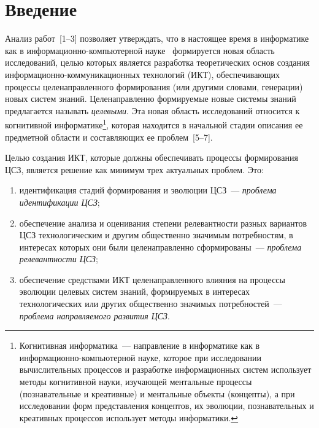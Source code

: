       \begin{multicols}{2}

      \label{st\stat}
      
\section{Введение}

   Анализ работ~[1--3] позволяет утверждать, что в настоящее время в информатике 
как в ин\-фор\-ма\-ци\-он\-но-компью\-тер\-ной науке~\cite{4zat} формируется новая область 
исследований, целью которых является разработка теоретических основ\linebreak
 создания 
информационно-коммуникационных тех\-но\-ло\-гий (ИКТ), обеспечивающих процессы 
целенаправленного формирования (или другими словами, генерации) новых систем знаний. 
Целенаправленно формируемые новые системы знаний предлагается называть 
\textit{целевыми}. Эта новая область исследований относится к когнитивной 
информатике\footnote[2]{Когнитивная информатика~--- направление в информатике как в информационно-компьютерной науке, 
которое при исследовании вычислительных процессов и разработке информационных 
систем использует методы когнитивной науки, изучающей ментальные процессы (познавательные и 
креативные) и ментальные объекты (концепты), а при исследовании форм представления концептов, их 
эволюции, познавательных и креативных процессов использует методы информатики.}, которая 
находится в начальной стадии описания ее предметной области и составляющих ее 
проблем~[5--7].
   
   Целью создания ИКТ, которые должны обеспечивать процессы формирования  
ЦСЗ, является решение как минимум трех актуальных проблем. Это:
   \begin{enumerate}[(1)]
\item идентификация стадий формирования и эволюции ЦСЗ~--- \textit{проблема 
идентификации ЦСЗ};
\item обеспечение анализа и оценивания степени релевантности разных вариантов 
ЦСЗ технологическим и другим общественно значимым потребностям, в 
интересах которых они были целенаправленно сформированы~--- \textit{проблема 
релевантности ЦСЗ};
\item обеспечение средствами ИКТ целенаправленного влияния на процессы 
эволюции целевых систем знаний, формируемых в интересах технологических или 
других общественно значимых потребностей~--- \textit{проблема направляемого 
развития ЦСЗ}.
\end{enumerate}


\end{multicols}
